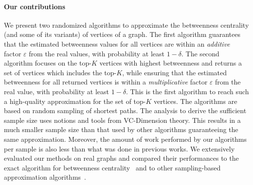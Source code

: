 \paragraph{Our contributions} 
We present two randomized algorithms to approximate the betweenness centrality
(and some of its variants) of vertices of a graph. The first algorithm
guarantees that the estimated betweenness values for all vertices are within an
\emph{additive} factor $\varepsilon$ from the real values, with probability at
least $1-\delta$. The second algorithm focuses on the top-$K$ vertices with
highest betweenness and returns a set of vertices which includes the top-$K$,
while ensuring that the estimated betweenness for all returned vertices is
within a \emph{multiplicative} factor $\varepsilon$ from the real value, with
probability at least $1-\delta$. This is the first algorithm to reach such a
high-quality approximation for the set of top-$K$ vertices. The algorithms are
based on random sampling of shortest paths. The analysis to derive the
sufficient sample size uses notions and tools from VC-Dimension theory. This
results in a much smaller sample size than that used by other algorithms
guaranteeing the same approximation. Moreover, the amount of work performed by
our algorithms per sample is also less than what was done in previous works.
We extensively evaluated our methods on real graphs and compared their
performances to the exact algorithm for betweenness
centrality~\citep{Brandes01} and to other sampling-based approximation
algorithms~\citep{JacobKLPT05,BrandesP07}.

